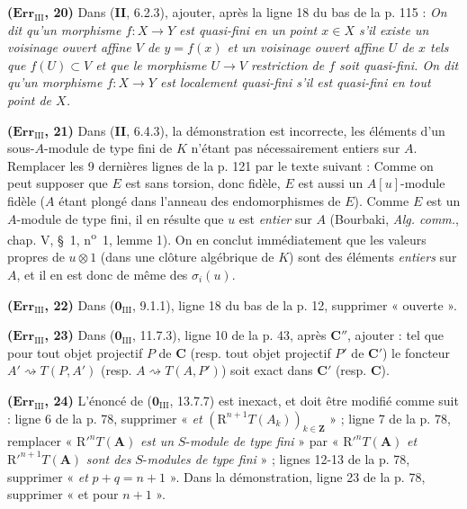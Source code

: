 \noindent\textbf{($\mathbf{Err}_{\mathrm{III}}$, 20)} Dans (\textbf{II}, 6.2.3),
ajouter, après la ligne 18 du bas de la p. 115 :
\emph{On dit qu'un morphisme $f:X\to Y$ est quasi-fini en un point $x\in X$
s'il existe un voisinage ouvert affine $V$ de $y=f(x)$ et un voisinage ouvert
affine $U$ de $x$ tels que $f(U)\subset V$ et que le morphisme $U\to V$
restriction de $f$ soit quasi-fini. On dit qu'un morphisme $f:X\to Y$ est
localement quasi-fini s'il est quasi-fini en tout point de $X$.}

\noindent\textbf{($\mathbf{Err}_{\mathrm{III}}$, 21)} Dans (\textbf{II}, 6.4.3), la
démonstration est incorrecte, les éléments d'un sous-$A$-module de type fini de
$K$ n'étant pas nécessairement entiers sur $A$. Remplacer les 9 dernières lignes
de la p. 121 par le texte suivant : Comme on peut supposer que $E$ est sans
torsion, donc fidèle, $E$ est aussi un $A[u]$-module fidèle ($A$ étant plongé
dans l'anneau des endomorphismes de $E$). Comme $E$ est un $A$-module de type
fini, il en résulte que $u$ est \emph{entier} sur $A$ (Bourbaki,
\emph{Alg. comm.}, chap. V, \S~1, n\textsuperscript{o}~1, lemme 1). On en
conclut immédiatement que les valeurs propres de $u\otimes1$ (dans une clôture
algébrique de $K$) sont des éléments \emph{entiers} sur $A$, et il en est donc
de même des $\sigma_i(u)$.

\noindent\textbf{($\mathbf{Err}_{\mathrm{III}}$, 22)} Dans
($\mathbf{0}_{\mathrm{III}}$, 9.1.1), ligne 18 du bas de la p. 12, supprimer
« ouverte ».

\noindent\textbf{($\mathbf{Err}_{\mathrm{III}}$, 23)} Dans
($\mathbf{0}_{\mathrm{III}}$, 11.7.3), ligne 10 de la p. 43, après $\boldsymbol{C}''$,
ajouter : tel que pour tout objet projectif $P$ de $\boldsymbol{C}$ (resp. tout
objet projectif $P'$ de $\boldsymbol{C}'$) le foncteur
$A'\rightsquigarrow T(P,A')$ (resp. $A\rightsquigarrow T(A,P')$) soit exact
dans $\boldsymbol{C}'$ (resp. $\boldsymbol{C}$).

\noindent\textbf{($\mathbf{Err}_{\mathrm{III}}$, 24)} L'énoncé de
($\mathbf{0}_{\mathrm{III}}$, 13.7.7) est inexact, et doit être modifié comme suit :
ligne 6 de la p. 78, supprimer « \emph{et}
$(\mathrm R^{n+1}T(A_k))_{k\in\mathbf Z}$ » ; ligne 7 de la p. 78, remplacer
« $\mathrm R'^nT(\mathbf A)$ \emph{est un} $S$-\emph{module de type fini} » par
« $\mathrm R'^nT(\mathbf A)$ \emph{et} $\mathrm R'^{n+1}T(\mathbf A)$ \emph{sont des} $S$-\emph{modules de type
fini} » ; lignes 12-13 de la p. 78, supprimer « \emph{et} $p+q=n+1$ ». Dans la
démonstration, ligne 23 de la p. 78, supprimer « et pour $n+1$ ».

